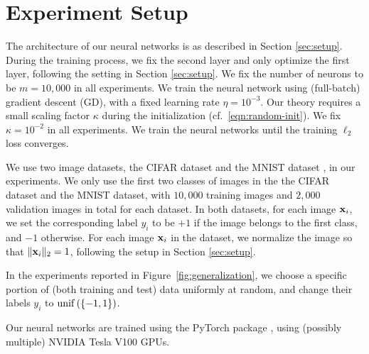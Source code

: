 \section{Experiment Setup}\label{sec:expdetails}
The architecture of our neural networks is as described in Section \ref{sec:setup}.
During the training process,  we fix the second layer and only optimize the first layer, following the setting in Section \ref{sec:setup}.
We fix the number of neurons to be $m = 10,000$ in all experiments. 
We train the neural network using (full-batch) gradient descent (GD), with a fixed learning rate $\eta = 10^{-3}$.
Our theory requires a small scaling factor $\kappa$ during the initialization (cf.~\eqref{eqn:random-init}).
We fix $\kappa = 10^{-2}$ in all experiments. 
We train the neural networks until the training $\ell_2$ loss converges. 


We use two image datasets, the CIFAR dataset \cite{krizhevsky2009learning} and the MNIST dataset \cite{lecun1998gradient}, in our experiments. 
We only use the first two classes of images in the the CIFAR dataset and the MNIST dataset,
with $10,000$ training images and $2,000$ validation images in total for each dataset.
In both datasets, for each image $\mathbf{x}_i$, we set the corresponding label $y_i$ to be $+1$ if the image belongs to the first class, and $-1$ otherwise.
For each image $\mathbf{x}_i$ in the dataset, we normalize the image so that $\|\mathbf{x}_i\|_2 = 1$, following the setup in Section \ref{sec:setup}.

In the experiments reported in Figure~\ref{fig:generalization}, we choose a specific portion of (both training and test) data uniformly at random, and change their labels $y_i$ to $\mathrm{unif}\left(\left\{-1,1\right\}\right)$.

Our neural networks are trained using the PyTorch package \cite{paszke2017automatic}, using (possibly multiple) NVIDIA Tesla V100 GPUs.